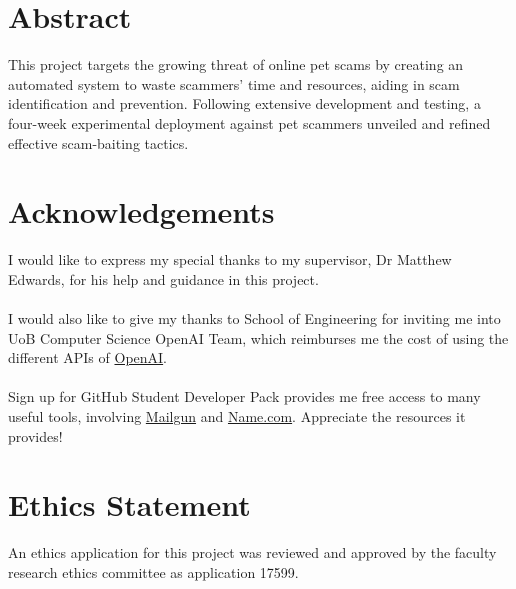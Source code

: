 \documentclass[ oneside,%
                    author={Cassie Qing Tang},
                    degree={BSc},
                     title={An Automated Response System for Disrupting Online Pet Scamming \\ },
                    subtitle={ }]{dissertation}
\begin{document}
\maketitle

\chapter*{Abstract}
This project targets the growing threat of online pet scams by creating an automated system to waste scammers' time and resources, aiding in scam identification and prevention. Following extensive development and testing, a four-week experimental deployment against pet scammers unveiled and refined effective scam-baiting tactics.

\chapter*{Acknowledgements}
I would like to express my special thanks to my supervisor, Dr Matthew Edwards, for his help and guidance in this project.
\\
\\
I would also like to give my thanks to School of Engineering for inviting me into UoB Computer Science OpenAI Team, which reimburses me the cost of using the different APIs of \href{https://openai.com/}{OpenAI}.
\\
\\
Sign up for GitHub Student Developer Pack provides me free access to many useful tools, involving \href{https://www.mailgun.com}{Mailgun} and \href{https://www.name.com}{Name.com}. Appreciate the resources it provides!

\makedecl


\tableofcontents
\listoffigures
\listoftables

\chapter*{Ethics Statement}
An ethics application for this project was reviewed and approved by the faculty research ethics committee as application 17599.
\end{document}
